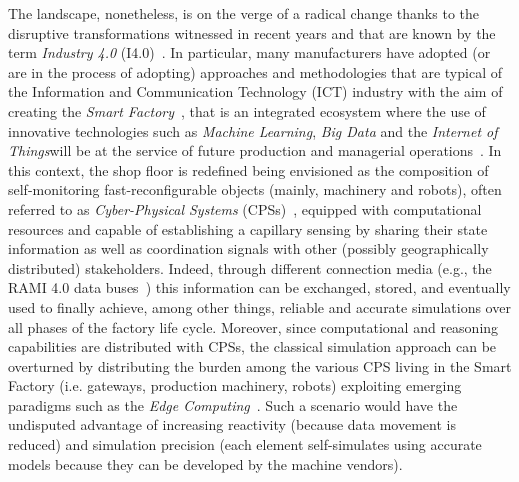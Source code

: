 The landscape, nonetheless, is on the verge of a radical change thanks to the disruptive transformations witnessed in recent years and that are known by the term \textit{Industry 4.0} (I4.0)~\cite{Lu2017}. 
In particular, many manufacturers have adopted (or are in the process of adopting) approaches and methodologies that are typical of the Information and Communication Technology (ICT) industry with the aim of creating the \textit{Smart Factory}~\cite{Lee2015,Hozdic2015}, that is an integrated ecosystem where the use of innovative technologies such as \textit{Machine Learning}, \textit{Big Data} and the \textit{Internet of Things}will be at the service of future production and managerial operations~\cite{Witkowski2017,Xu2014}.
In this context, the shop floor is redefined being envisioned as the composition of self-monitoring fast-reconfigurable objects (mainly, machinery and robots), often referred to as \textit{Cyber-Physical Systems} (CPSs)~\cite{Jazdi2014}, equipped with computational resources and capable of establishing a capillary sensing by sharing their state information as well as coordination signals with other (possibly geographically distributed) stakeholders. 
Indeed, through different connection media (e.g., the RAMI 4.0 data buses~\cite{hankel2015reference}) this information can be exchanged, stored, and eventually used to finally achieve, among other things, reliable and accurate simulations over all phases of the factory life cycle. 
Moreover, since computational and reasoning capabilities are distributed with CPSs, the classical simulation approach can be overturned by distributing the burden among the various CPS living in the Smart Factory (i.e. gateways, production machinery, robots) exploiting emerging paradigms such as the \textit{Edge Computing}~\cite{georgakopoulos2016internet}. 
Such a scenario would have the undisputed advantage of increasing reactivity (because data movement is reduced) and simulation precision (each element self-simulates using accurate models because they can be developed by the machine vendors). 


